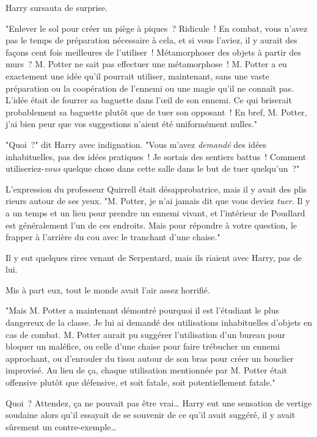 Harry sursauta de surprise.

"Enlever le sol pour créer un piège à piques~? Ridicule~! En combat, vous n'avez pas le temps de préparation nécessaire à cela, et si vous l'aviez, il y aurait des façons cent fois meilleures de l'utiliser~! Métamorphoser des objets à partir des murs~? M. Potter ne sait pas effectuer une métamorphose~! M. Potter a eu exactement une idée qu'il pourrait utiliser, maintenant, sans une vaste préparation ou la coopération de l'ennemi ou une magie qu'il ne connaît pas. L'idée était de fourrer sa baguette dans l'œil de son ennemi. Ce qui briserait probablement sa baguette plutôt que de tuer son opposant~! En bref, M. Potter, j'ai bien peur que vos suggestions n'aient été uniformément nulles."

"Quoi~?" dit Harry avec indignation. "Vous m'avez \emph{demandé} des idées inhabituelles, pas des idées pratiques~! Je sortais des sentiers battus~! Comment utiliseriez-\emph{vous} quelque chose dans cette salle dans le but de tuer quelqu'un~?"

L'expression du professeur Quirrell était désapprobatrice, mais il y avait des plis rieurs autour de ses yeux. "M. Potter, je n'ai jamais dit que vous deviez \emph{tuer}. Il y a un temps et un lieu pour prendre un ennemi vivant, et l'intérieur de Poudlard est généralement l'un de ces endroits. Mais pour répondre à votre question, le frapper à l'arrière du cou avec le tranchant d'une chaise."

Il y eut quelques rires venant de Serpentard, mais ils riaient avec Harry, pas de lui.

Mis à part eux, tout le monde avait l'air assez horrifié.

"Mais M. Potter a maintenant démontré pourquoi il est l'étudiant le plus dangereux de la classe. Je lui ai demandé des utilisations inhabituelles d'objets en cas de combat. M. Potter aurait pu suggérer l'utilisation d'un bureau pour bloquer un maléfice, ou celle d'une chaise pour faire trébucher un ennemi approchant, ou d'enrouler du tissu autour de son bras pour créer un bouclier improvisé. Au lieu de ça, chaque utilisation mentionnée par M. Potter était offensive plutôt que défensive, et soit fatale, soit potentiellement fatale."

Quoi~? Attendez, ça ne pouvait pas être vrai… Harry eut une sensation de vertige soudaine alors qu'il essayait de se souvenir de ce qu'il avait suggéré, il y avait sûrement un contre-exemple…

